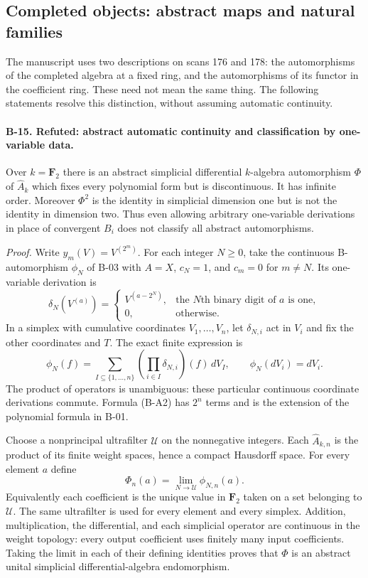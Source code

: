 \subsection{Completed objects: abstract maps and natural families}

The manuscript uses two descriptions on scans 176 and 178: the
automorphisms of the completed algebra at a fixed ring, and the
automorphisms of its functor in the coefficient ring. These need
not mean the same thing. The following statements resolve this
distinction, without assuming automatic continuity.

\paragraph{B-15. Refuted: abstract automatic continuity and
classification by one-variable data.}
Over $k=\mathbf F_2$ there is an abstract simplicial differential
$k$-algebra automorphism $\Phi$ of $\widehat A_k$ which fixes every
polynomial form but is discontinuous. It has infinite order.
Moreover $\Phi^2$ is the identity in simplicial dimension one but
is not the identity in dimension two. Thus even allowing arbitrary
one-variable derivations in place of convergent $B_i$ does not
classify all abstract automorphisms.

\emph{Proof.}
Write $y_m(V)=V^{(2^m)}$. For each integer $N\geq0$, take the
continuous B-automorphism $\phi_N$ of B-03 with $A=X$, $c_N=1$,
and $c_m=0$ for $m\ne N$. Its one-variable derivation is
\[
 \delta_N(V^{(a)})=
 \begin{cases}
 V^{(a-2^N)},&\text{the $N$th binary digit of $a$ is one},\\
 0,&\text{otherwise}.
 \end{cases}
 \tag{B-A1}
\]
In a simplex with cumulative coordinates $V_1,\ldots,V_n$, let
$\delta_{N,i}$ act in $V_i$ and fix the other coordinates and $T$.
The exact finite expression is
\[
 \phi_N(f)=\sum_{I\subseteq\{1,\ldots,n\}}
        \left(\prod_{i\in I}\delta_{N,i}\right)(f)\,dV_I,
 \qquad \phi_N(dV_i)=dV_i.
 \tag{B-A2}
\]
The product of operators is unambiguous: these particular continuous
coordinate derivations commute. Formula (B-A2) has $2^n$ terms and
is the extension of the polynomial formula in B-01.

Choose a nonprincipal ultrafilter $\mathcal U$ on the nonnegative
integers. Each $\widehat A_{k,n}$ is the product of its finite
weight spaces, hence a compact Hausdorff space. For every element
$a$ define
\[
 \Phi_n(a)=\lim_{N\to\mathcal U}\phi_{N,n}(a).
 \tag{B-A3}
\]
Equivalently each coefficient is the unique value in $\mathbf F_2$
taken on a set belonging to $\mathcal U$. The same ultrafilter is
used for every element and every simplex. Addition, multiplication,
the differential, and each simplicial operator are continuous in
the weight topology: every output coefficient uses finitely many
input coefficients. Taking the limit in each of their defining
identities proves that $\Phi$ is an abstract unital simplicial
differential-algebra endomorphism.

